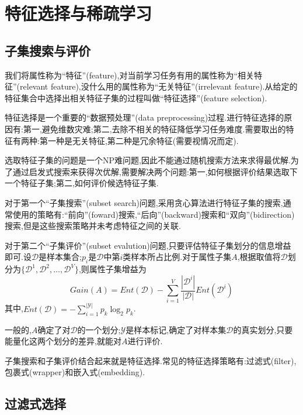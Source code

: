 \chapter{特征选择与稀疏学习}

\section{子集搜索与评价}

我们将属性称为``特征''(feature),对当前学习任务有用的属性称为``相关特征''(relevant feature),没什么用的属性称为``无关特征''(irrelevant feature).从给定的特征集合中选择出相关特征子集的过程叫做``特征选择''(feature selection).

特征选择是一个重要的``数据预处理''(data preprocessing)过程.进行特征选择的原因有:第一,避免维数灾难;第二,去除不相关的特征降低学习任务难度.需要取出的特征有两种:第一种是无关特征,第二种是冗余特征(需要视情况而定).

选取特征子集的问题是一个NP难问题,因此不能通过随机搜索方法来求得最优解.为了通过启发式搜索来获得次优解,需要解决两个问题:第一,如何根据评价结果选取下一个特征子集;第二,如何评价候选特征子集.

对于第一个``子集搜索''(subset search)问题,采用贪心算法进行特征子集的搜索,通常使用的策略有:``前向''(foward)搜索,``后向''(backward)搜索和``双向''(bidirection)搜索,但是这些搜索策略并未考虑特征之间的关联.

对于第二个``子集评价''(subset evalution)问题,只要评估特征子集划分的信息增益即可.设$\mathcal{D}$是样本集合;$p_i$是$\mathcal{D}$中第$i$类样本所占比例.对于属性子集$A$,根据取值将$\mathcal{D}$划分为$\{\mathcal{D}^1,\mathcal{D}^2,\dots,\mathcal{D}^V\}$,则属性子集增益为
\begin{equation}
Gain(A)=Ent(\mathcal{D})-\sum_{i=1}^V\frac{|\mathcal{D}^i|}{|\mathcal{D}|}Ent(\mathcal{D}^i)
\end{equation}
其中,$Ent(\mathcal{D})=-\sum_{i=1}^{|\mathcal{Y}|}p_k\log_2p_k$.

一般的,$A$确定了对$\mathcal{D}$的一个划分;$\mathcal{Y}$是样本标记,确定了对样本集$\mathcal{D}$的真实划分,只要能量化这两个划分的差异,就能对$A$进行评价.

子集搜索和子集评价结合起来就是特征选择.常见的特征选择策略有:过滤式(filter),包裹式(wrapper)和嵌入式(embedding).

\section{过滤式选择}

